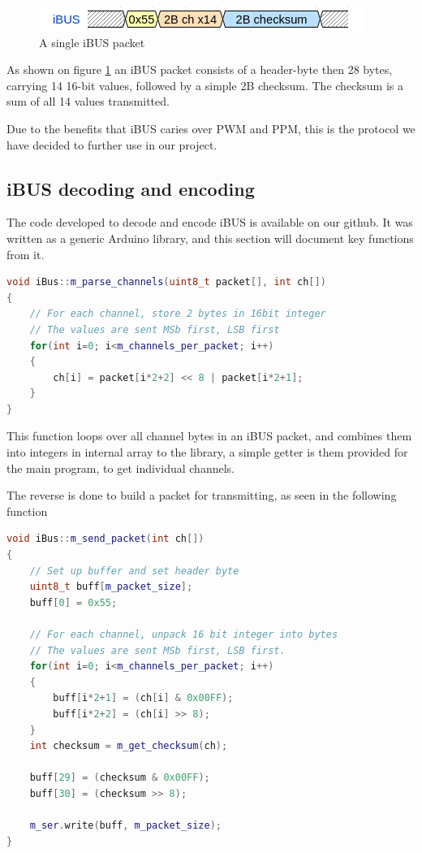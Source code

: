 \begin{figure}[h]
    \centering
    \includegraphics[width=0.8\columnwidth]{figures/ch_design/iBUS.png}
    \caption{A single iBUS packet}
    \label{fig:iBUS}
\end{figure}

As shown on figure \ref{fig:iBUS} an iBUS packet consists of a header-byte then 28 bytes, carrying 14 16-bit values, followed by a simple 2B checksum. The checksum is a sum of all 14 values transmitted.

Due to the benefits that iBUS caries over PWM and PPM, this is the protocol we have decided to further use in our project.

\subsection*{iBUS decoding and encoding}\label{iBUS library}

The code developed to decode and encode iBUS is available on our github\cite{ibus-lib}.
It was written as a generic Arduino library, and this section will document key functions from it.

\begin{lstlisting}[language=C++, caption={Parser for iBUS packets}]
void iBus::m_parse_channels(uint8_t packet[], int ch[])
{
	// For each channel, store 2 bytes in 16bit integer
	// The values are sent MSb first, LSB first
	for(int i=0; i<m_channels_per_packet; i++)
	{
		ch[i] = packet[i*2+2] << 8 | packet[i*2+1];
	}
}
\end{lstlisting}

This function loops over all channel bytes in an iBUS packet, and combines them into integers in internal array to the library, a simple getter is them provided for the main program, to get individual channels.

The reverse is done to build a packet for transmitting, as seen in the following function

\begin{lstlisting}[language=C++, caption={Function for constructing and transmitting for iBUS packets}]
void iBus::m_send_packet(int ch[])
{
	// Set up buffer and set header byte
	uint8_t buff[m_packet_size];
	buff[0] = 0x55;

	// For each channel, unpack 16 bit integer into bytes
	// The values are sent MSb first, LSB first.
	for(int i=0; i<m_channels_per_packet; i++)
	{
		buff[i*2+1] = (ch[i] & 0x00FF);
		buff[i*2+2] = (ch[i] >> 8);
	}
	int checksum = m_get_checksum(ch);

	buff[29] = (checksum & 0x00FF);
	buff[30] = (checksum >> 8);

	m_ser.write(buff, m_packet_size);
}
\end{lstlisting}

